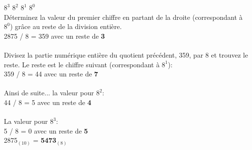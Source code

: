 \begin{Exercice}[20 minutes]
\begin{solution}
        $8^3$   $8^2$   $8^1$   $8^0$ \\

        Déterminez la valeur du premier chiffre en partant de la droite (correspondant à $8^0$) grâce au reste de la division entière.\\
        2875 / 8 = 359 avec un reste de \textbf{3}\\\\
        Divisez la partie numérique entière du quotient précédent, 359, par 8 et trouvez le reste. Le reste est le chiffre suivant (correspondant à $8^1$):\\
        359 / 8 = 44 avec un reste de \textbf{7}\\\\
        Ainsi de suite... la valeur pour $8^2$:\\
        44 / 8 = 5 avec un reste de \textbf{4}\\\\
        La valeur pour $8^3$:\\
        5 / 8 = 0 avec un reste de \textbf{5}\\

        2875$_{(10)}$ = \textbf{5473$_{(8)}$}    
    \end{solution} 

\end{Exercice}

